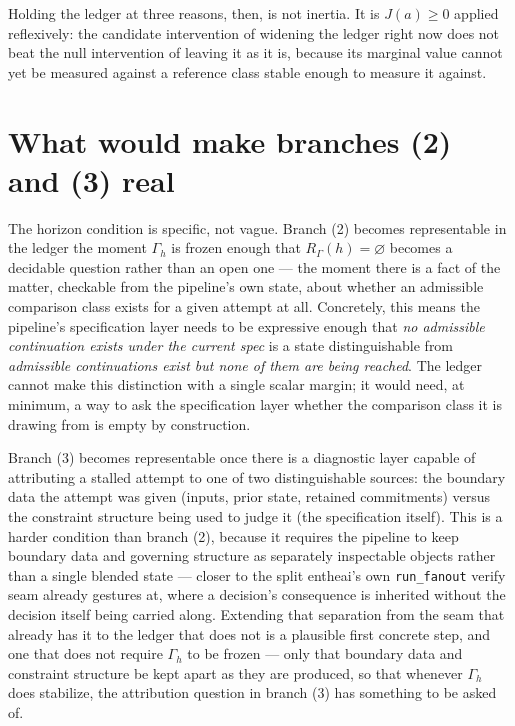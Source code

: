 \documentclass[11pt,openany]{book}
\begin{document}
Holding the ledger at three reasons, then, is not inertia. It is $J(a) \geq 0$ applied reflexively: the candidate intervention of widening the ledger right now does not beat the null intervention of leaving it as it is, because its marginal value cannot yet be measured against a reference class stable enough to measure it against.

\section{What would make branches (2) and (3) real}

The horizon condition is specific, not vague. Branch (2) becomes representable in the ledger the moment $\Gamma_h$ is frozen enough that $R_\Gamma(h) = \varnothing$ becomes a decidable question rather than an open one — the moment there is a fact of the matter, checkable from the pipeline's own state, about whether an admissible comparison class exists for a given attempt at all. Concretely, this means the pipeline's specification layer needs to be expressive enough that \emph{no admissible continuation exists under the current spec} is a state distinguishable from \emph{admissible continuations exist but none of them are being reached}. The ledger cannot make this distinction with a single scalar margin; it would need, at minimum, a way to ask the specification layer whether the comparison class it is drawing from is empty by construction.

Branch (3) becomes representable once there is a diagnostic layer capable of attributing a stalled attempt to one of two distinguishable sources: the boundary data the attempt was given (inputs, prior state, retained commitments) versus the constraint structure being used to judge it (the specification itself). This is a harder condition than branch (2), because it requires the pipeline to keep boundary data and governing structure as separately inspectable objects rather than a single blended state — closer to the split entheai's own \texttt{run\_fanout} verify seam already gestures at, where a decision's consequence is inherited without the decision itself being carried along. Extending that separation from the seam that already has it to the ledger that does not is a plausible first concrete step, and one that does not require $\Gamma_h$ to be frozen — only that boundary data and constraint structure be kept apart as they are produced, so that whenever $\Gamma_h$ does stabilize, the attribution question in branch (3) has something to be asked of.
\end{document}
